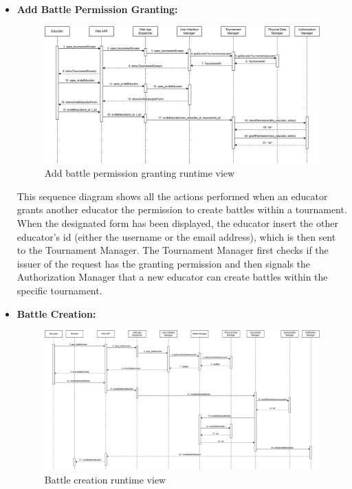 \begin{itemize}
    \newpage
    
    \item \textbf{Add Battle Permission Granting:}

    \begin{figure}[H]
        \centering
        \includegraphics[width=1\linewidth]{Images/RV6.png}
        \caption{Add battle permission granting runtime view}
        \label{fig:rv6}
    \end{figure}

    This sequence diagram shows all the actions performed when an educator grants another educator the permission to create battles within a tournament. When the designated form has been displayed, the educator insert the other educator's id (either the username or the email address), which is then sent to the Tournament Manager. The Tournament Manager first checks if the issuer of the request has the granting permission and then signals the Authorization Manager that a new educator can create battles within the specific tournament.

    \newpage

    \item \textbf{Battle Creation:}

    \begin{figure}[H]
        \centering
        \includegraphics[width=1\linewidth]{Images/RV7.png}
        \caption{Battle creation runtime view}
        \label{fig:rv7}
    \end{figure}


\end{itemize}
